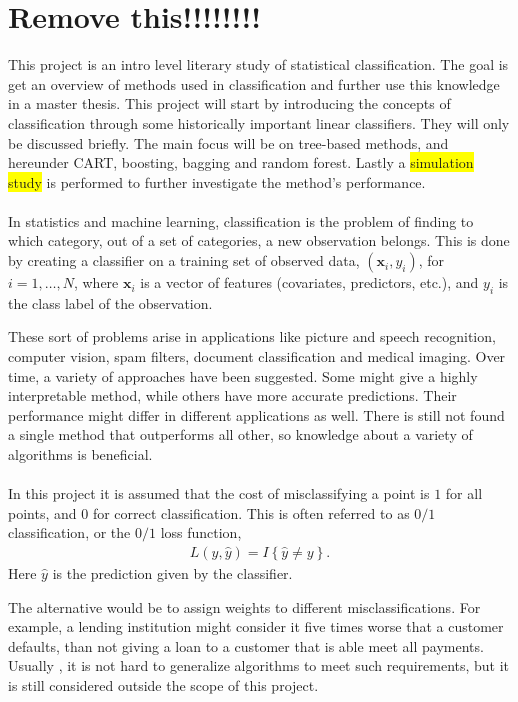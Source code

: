\section{Remove this!!!!!!!!}
\label{sec:Remove this!!!!!!!!}

This project is an intro level literary study of statistical classification. The goal is get an overview of methods used in classification and further use this knowledge in a master thesis. This project will start by introducing the concepts of classification through some historically important linear classifiers. They will only be discussed briefly. The main focus will be on tree-based methods, and hereunder CART, boosting, bagging and random forest. Lastly a \colorbox{yellow}{simulation study} is performed to further investigate the method's performance. 
\\
\\
In statistics and machine learning, classification is the problem of finding to which category, out of a set of categories, a new observation belongs. This is done by creating a classifier on a training set of observed data, $(\mathbf{x}_i, y_i)$, for $i = 1, \ldots, N$, where $\mathbf{x}_i$ is a vector of features (covariates, predictors, etc.), and $y_i$ is the class label of the observation. 

These sort of problems arise in applications like picture and speech recognition, computer vision, spam filters, document classification and medical imaging.
Over time, a variety of approaches have been suggested. Some might give a highly interpretable method, while others have more accurate predictions. Their performance might differ in different applications as well. There is still not found a single method that outperforms all other, so knowledge about a variety of algorithms is beneficial. 
\\
\\
In this project it is assumed that the cost of misclassifying a point is $1$ for all points, and $0$ for correct classification. This is often referred to as $0/1$ classification, or the $0/1$ loss function, 
\begin{align}
  L(y, \hat y) = I\left\{ \hat y \neq y \right\}.
\end{align}
Here $\hat y$ is the prediction given by the classifier. 

The alternative would be to assign weights to different misclassifications. For example, a lending institution might consider it five times worse that a customer defaults, than not giving a loan to a customer that is able meet all payments. Usually , it is not hard to generalize algorithms to meet such requirements, but it is still considered outside the scope of this project.

